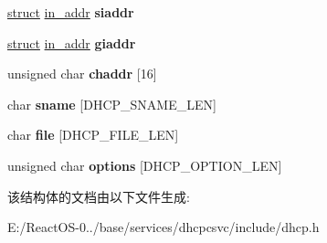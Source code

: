 \begin{DoxyCompactItemize}
\item 
\mbox{\label{structdhcp__packet_a04df7f134319a87ccc97d46a701a5393}} 
\hyperlink{interfacestruct}{struct} \hyperlink{structin__addr}{in\+\_\+addr} {\bfseries siaddr}
\item 
\mbox{\label{structdhcp__packet_a8d4c7ee3487665b71eac85b2e87ae1f2}} 
\hyperlink{interfacestruct}{struct} \hyperlink{structin__addr}{in\+\_\+addr} {\bfseries giaddr}
\item 
\mbox{\label{structdhcp__packet_af016a594ae475bd0adbf4d8182a3b623}} 
unsigned char {\bfseries chaddr} \mbox{[}16\mbox{]}
\item 
\mbox{\label{structdhcp__packet_af7c69522331c10693bc8419238e65229}} 
char {\bfseries sname} \mbox{[}D\+H\+C\+P\+\_\+\+S\+N\+A\+M\+E\+\_\+\+L\+EN\mbox{]}
\item 
\mbox{\label{structdhcp__packet_a261b9bf2d6cc9353a6b3341dda0c85c3}} 
char {\bfseries file} \mbox{[}D\+H\+C\+P\+\_\+\+F\+I\+L\+E\+\_\+\+L\+EN\mbox{]}
\item 
\mbox{\label{structdhcp__packet_a6865969115ed0651bf00303356144a5a}} 
unsigned char {\bfseries options} \mbox{[}D\+H\+C\+P\+\_\+\+O\+P\+T\+I\+O\+N\+\_\+\+L\+EN\mbox{]}
\end{DoxyCompactItemize}


该结构体的文档由以下文件生成\+:\begin{DoxyCompactItemize}
\item 
E\+:/\+React\+O\+S-\/0../base/services/dhcpcsvc/include/dhcp.\+h\end{DoxyCompactItemize}
